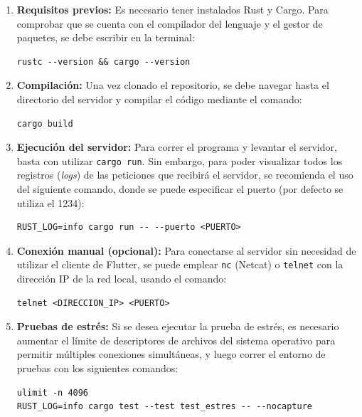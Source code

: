 \begin{enumerate}
    \item \textbf{Requisitos previos:} Es necesario tener instalados Rust y Cargo. Para comprobar que se cuenta con el compilador del lenguaje y el gestor de paquetes, se debe escribir en la terminal:
\begin{lstlisting}
rustc --version && cargo --version
\end{lstlisting}

    \item \textbf{Compilación:} Una vez clonado el repositorio, se debe navegar hasta el directorio del servidor y compilar el código mediante el comando:
\begin{lstlisting}
cargo build
\end{lstlisting}

    \item \textbf{Ejecución del servidor:} Para correr el programa y levantar el servidor, basta con utilizar \texttt{cargo run}. Sin embargo, para poder visualizar todos los registros (\textit{logs}) de las peticiones que recibirá el servidor, se recomienda el uso del siguiente comando, donde se puede especificar el puerto (por defecto se utiliza el 1234):
\begin{lstlisting}
RUST_LOG=info cargo run -- --puerto <PUERTO>
\end{lstlisting}

    \item \textbf{Conexión manual (opcional):} Para conectarse al servidor sin necesidad de utilizar el cliente de Flutter, se puede emplear \texttt{nc} (Netcat) o \texttt{telnet} con la dirección IP de la red local, usando el comando:
\begin{lstlisting}
telnet <DIRECCION_IP> <PUERTO>
\end{lstlisting}

    \item \textbf{Pruebas de estrés:} Si se desea ejecutar la prueba de estrés, es necesario aumentar el límite de descriptores de archivos del sistema operativo para permitir múltiples conexiones simultáneas, y luego correr el entorno de pruebas con los siguientes comandos:
\begin{lstlisting}
ulimit -n 4096
RUST_LOG=info cargo test --test test_estres -- --nocapture
\end{lstlisting}
\end{enumerate}


